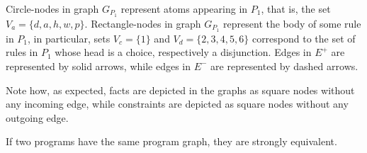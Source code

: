 \begin{example}
  Circle-nodes in graph $G_{P_{1}}$ represent atoms appearing in $P_1$, that is, the set $V_a = \{d,a,h,w,p\}$.
  Rectangle-nodes in graph $G_{P_{1}}$ represent the body of some rule in $P_1$, in particular, sets $V_c = \{1\}$
  and $V_d = \{2,3,4,5,6\}$ correspond to the set of rules in $P_1$ whose head is a choice, respectively a disjunction.
  Edges in $E^{+}$ are represented by solid arrows, while edges in $E^{-}$ are represented by dashed arrows.

  Note how, as expected, facts are depicted in the graphs as square nodes without any incoming edge, while constraints are depicted as square nodes without any outgoing edge.
\end{example}

\begin{proposition}
  If two programs have the same program graph, they are strongly equivalent.
\end{proposition}


